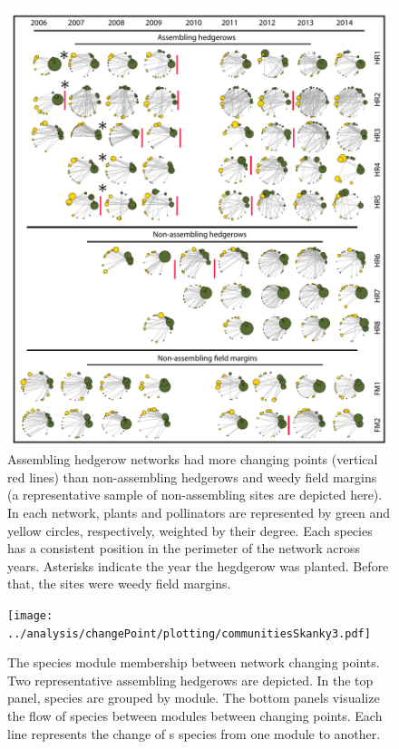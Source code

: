 \documentclass[12pt]{article}
\begin{document}
\begin{figure}
  \centering
  \includegraphics[width=1\textwidth]{../analysis/changePoint/plotting/networksv1.pdf}
  \caption{Assembling hedgerow networks had more changing points
    (vertical red lines) than non-assembling hedgerows and weedy field
    margins (a representative sample of non-assembling sites are
    depicted here). In each network, plants and pollinators are
    represented by green and yellow circles, respectively, weighted by
    their degree. Each species has a consistent position in the
    perimeter of the network across years. Asterisks indicate the year the hegdgerow
    was planted. Before that, the sites were weedy field margins.}
  \label{fig:changePoints}
\end{figure}
\clearpage

\begin{figure}
  \centering
  \texttt{[image: ../analysis/changePoint/plotting/communitiesSkanky3.pdf]}
  \caption{The species module membership between network changing points. Two
    representative assembling hedgerows are depicted. In the top
    panel, species are grouped by module. The bottom panels visualize
    the flow of species between modules between changing points. Each line represents the change of s species from one module to another. }
  \label{fig:changePoints2}
\end{figure}
\clearpage
\end{document}
